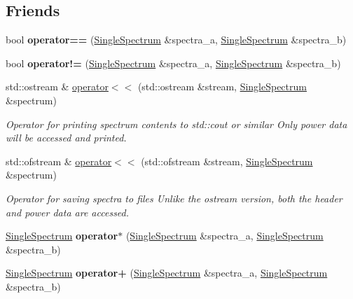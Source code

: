 \subsection*{Friends}
\begin{DoxyCompactItemize}
\item 
bool {\bfseries operator==} (\hyperlink{class_single_spectrum}{Single\+Spectrum} \&spectra\+\_\+a, \hyperlink{class_single_spectrum}{Single\+Spectrum} \&spectra\+\_\+b)\hypertarget{class_single_spectrum_a6ba91d2d92db2828951645e19e0a0384}{}\label{class_single_spectrum_a6ba91d2d92db2828951645e19e0a0384}

\item 
bool {\bfseries operator!=} (\hyperlink{class_single_spectrum}{Single\+Spectrum} \&spectra\+\_\+a, \hyperlink{class_single_spectrum}{Single\+Spectrum} \&spectra\+\_\+b)\hypertarget{class_single_spectrum_ae0a9f33112a5508cf8d5613a165c11df}{}\label{class_single_spectrum_ae0a9f33112a5508cf8d5613a165c11df}

\item 
std\+::ostream \& \hyperlink{class_single_spectrum_a260e8ff3518714d32d964dd7e2a6bf39}{operator$<$$<$} (std\+::ostream \&stream, \hyperlink{class_single_spectrum}{Single\+Spectrum} \&spectrum)
\begin{DoxyCompactList}\small\item\em Operator for printing spectrum contents to std\+::cout or similar Only power data will be accessed and printed. \end{DoxyCompactList}\item 
std\+::ofstream \& \hyperlink{class_single_spectrum_aa4fcc146ff71fd379f2e6dab83125c74}{operator$<$$<$} (std\+::ofstream \&stream, \hyperlink{class_single_spectrum}{Single\+Spectrum} \&spectrum)
\begin{DoxyCompactList}\small\item\em Operator for saving spectra to files Unlike the ostream version, both the header and power data are accessed. \end{DoxyCompactList}\item 
\hyperlink{class_single_spectrum}{Single\+Spectrum} {\bfseries operator$\ast$} (\hyperlink{class_single_spectrum}{Single\+Spectrum} \&spectra\+\_\+a, \hyperlink{class_single_spectrum}{Single\+Spectrum} \&spectra\+\_\+b)\hypertarget{class_single_spectrum_ac71261d3ce99c4028fae4996736a72b3}{}\label{class_single_spectrum_ac71261d3ce99c4028fae4996736a72b3}

\item 
\hyperlink{class_single_spectrum}{Single\+Spectrum} {\bfseries operator+} (\hyperlink{class_single_spectrum}{Single\+Spectrum} \&spectra\+\_\+a, \hyperlink{class_single_spectrum}{Single\+Spectrum} \&spectra\+\_\+b)\hypertarget{class_single_spectrum_aff381ffcc9205b4b376b6af20c6bd98d}{}\label{class_single_spectrum_aff381ffcc9205b4b376b6af20c6bd98d}


\end{DoxyCompactItemize}
